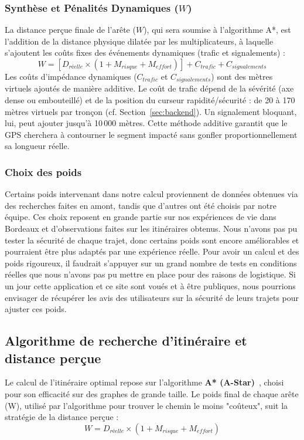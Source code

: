 \subsubsection{Synthèse et Pénalités Dynamiques ($W$)}
La distance perçue finale de l'arête ($W$), qui sera soumise à l'algorithme A*, est l'addition de la distance physique dilatée par les multiplicateurs, à laquelle s'ajoutent les coûts fixes des événements dynamiques (trafic et signalements) :
\begin{equation}
    W = \left[ D_{réelle} \times (1 + M_{risque} + M_{effort}) \right] + C_{trafic} + C_{signalements}
\end{equation}
Les coûts d'impédance dynamiques ($C_{trafic}$ et $C_{signalements}$) sont des mètres virtuels ajoutés de manière additive. Le coût de trafic dépend de la sévérité (axe dense ou embouteillé) et de la position du curseur rapidité/sécurité : de 20 à 170 mètres virtuels par tronçon (cf. Section~\ref{sec:backend}). Un signalement bloquant, lui, peut ajouter jusqu'à 10\,000 mètres.
Cette méthode additive garantit que le GPS cherchera à contourner le segment impacté sans gonfler proportionnellement sa longueur réelle.

\subsubsection{Choix des poids}
Certains poids intervenant dans notre calcul proviennent de données obtenues via des recherches faites en amont, tandis que d'autres ont été choisis par notre équipe.
Ces choix reposent en grande partie sur nos expériences de vie dans Bordeaux et d'observations faites sur les itinéraires obtenus.
Nous n'avons pas pu tester la sécurité de chaque trajet, donc certains poids sont encore améliorables et pourraient être plus adaptés par une expérience réelle.
Pour avoir un calcul et des poids rigoureux, il faudrait s'appuyer sur un grand nombre de tests en conditions réelles que nous n'avons pas pu mettre en place pour des raisons de logistique.
Si un jour cette application et ce site sont voués et à être publiques, nous pourrions envisager de récupérer les avis des utilisateurs sur la sécurité de leurs trajets pour ajuster ces poids.

\subsection{Algorithme de recherche d'itinéraire et distance perçue}

Le calcul de l'itinéraire optimal repose sur l'algorithme \textbf{A* (A-Star)}~\cite{AStar}, choisi pour son efficacité sur des graphes de grande taille. Le poids final de chaque arête (W), utilisé par l'algorithme pour trouver le chemin le moins "coûteux", suit la stratégie de la distance perçue :
\begin{equation}
W = D_{réelle} \times (1 + M_{risque} + M_{effort})
\end{equation}

